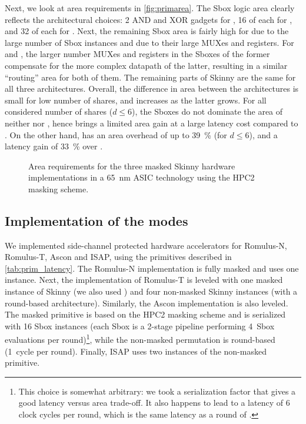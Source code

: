 \documentclass{llncs}
\begin{document}
Next, we look at area requirements in \autoref{fig:primarea}.
The Sbox logic area clearly reflects the architectural choices: 2 AND and XOR
gadgets for \skinnys, 16 of each for \skinnyb, and 32 of each for \skinnyll.
Next, the remaining Sbox area is fairly high for \skinnyll due to the large
number of Sbox instances and due to their large MUXes and registers.
For \skinnyb and \skinnys, the larger number MUXes and registers in the Sboxes
of the former compensate for the more complex datapath of the latter, resulting
in a similar ``routing'' area for both of them.
The remaining parts of Skinny are the same for all three architectures.
Overall, the difference in area between the architectures is small for low
number of shares, and increases as the latter grows.
For all considered number of shares ($d \le 6$), the Sboxes do not dominate the
area of neither \skinnys nor \skinnyb, hence \skinnys brings a limited area
gain at a large latency cost compared to \skinnyb.
On the other hand, \skinnyll has an area overhead of up to 39~\% (for $d\le 6$),
and a latency gain of 33~\% over \skinnyb.
\begin{figure}
	\centering
	
        \caption{
            Area requirements for the three masked Skinny hardware implementations in a
            \SI{65}{nm} ASIC technology using the HPC2 masking scheme.
        }
        \label{fig:primarea}\vspace*{-1cm}
\end{figure}

\subsection{Implementation of the modes}\label{subsec:modes}



We implemented side-channel protected hardware accelerators for
Romulus-N, Romulus-T, Ascon and ISAP, using the primitives described
in \autoref{tab:prim_latency}.
The Romulus-N implementation is fully masked and uses one
\skinnyll instance.
Next, the implementation of Romulus-T is leveled 
with one masked instance of Skinny (we also used \skinnyll) and four non-masked
Skinny instances (with a round-based architecture).
Similarly, the Ascon implementation is also leveled.
The masked \asconp primitive is based on the HPC2 masking scheme and is
serialized with 16 Sbox instances (each Sbox is a 2-stage pipeline 
performing 4~Sbox evaluations per round)\footnote{%
    This choice is somewhat arbitrary: we took a serialization factor that gives a good
    latency versus area trade-off.
    It also happens to lead to a latency of 6 clock cycles per round, which is
    the same latency as a round of \skinnyll.
},
while the non-masked permutation is round-based (1~cycle per round).
Finally, ISAP uses two instances of the non-masked \asconp primitive.
\end{document}
